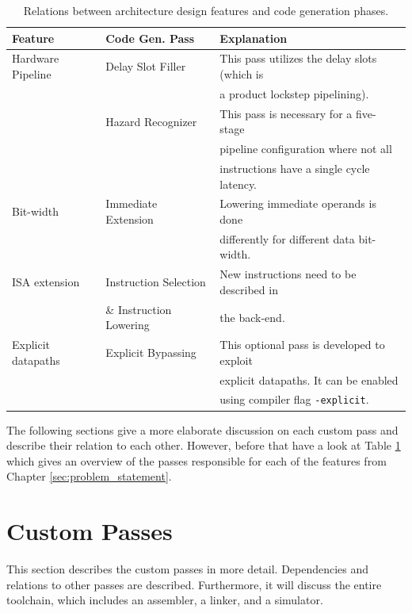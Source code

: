 \begin{table}[t!]
\caption{Relations between architecture design features and code generation phases.}
\begin{center}
\begin{tabular}{@{}l l l@{}}
\toprule
\textbf{Feature} & \textbf{Code Gen. Pass} & \textbf{Explanation}\\ \hline
Hardware Pipeline 	& Delay Slot Filler 		& This pass utilizes the delay slots (which is\\
				&					& a product lockstep pipelining).\\
			 	& Hazard Recognizer 	& This pass is necessary for a five-stage \\
				&					& pipeline configuration where not all\\
				&					& instructions have a single cycle latency.\\
Bit-width 			& Immediate Extension 	& Lowering immediate operands is done\\
				&				    	& differently for different data bit-width. \\
ISA extension		& Instruction Selection 	& New instructions need to be described in\\
				& \& Instruction Lowering	& the back-end. \\
Explicit datapaths 	& Explicit Bypassing		& This optional pass is developed to exploit\\
				&					& explicit datapaths. It can be enabled\\
				&					& using compiler flag \texttt{-explicit}. \\
\bottomrule
\end{tabular}
\end{center}
\label{table:rel_feature_pass}
\end{table}%

The following sections give a more elaborate discussion on each custom pass and describe their relation to each other. However, before that have a look at Table \ref{table:rel_feature_pass} which gives an overview of the passes responsible for each of the features from Chapter \ref{sec:problem_statement}. 

\section{Custom Passes}
This section describes the custom passes in more detail. Dependencies and relations to other passes are described. Furthermore, it will discuss the entire toolchain, which includes an assembler, a linker, and a simulator. 

